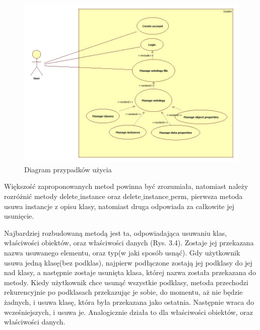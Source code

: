 \documentclass[a4paper,12pt, twoside]{book} %
\begin{document}
  \begin{figure}[h]
 	\centering
 	\includegraphics[scale=0.5]{UseCaseDiagram.jpg}
 	\caption{Diagram przypadków użycia}
 \end{figure}
 
  Większość zaproponowanych metod powinna być zrozumiała, natomiast należy rozróżnić metody delete$\_$instance oraz delete$\_$instance$\_$perm, pierwsza metoda usuwa instancje z opisu klasy, natomiast druga odpowiada za całkowite jej usunięcie.

 


Najbardziej rozbudowaną metodą jest ta, odpowiadająca usuwaniu klas, właściwości obiektów, oraz właściwości danych (Rys. 3.4). Zostaje jej przekazana nazwa usuwanego elementu, oraz typ(w jaki sposób usnąć). Gdy użytkownik usuwa jedną klasę(bez podklas), najpierw podłączone zostają jej podklasy do jej nad klasy, a następnie zostaje usunięta klasa, której nazwa została przekazana do metody. Kiedy użytkownik chce usunąć wszystkie podklasy, metoda przechodzi rekurencyjnie po podklasach przekazując je sobie, do momentu, aż nie będzie żadnych, i usuwa klasę, która była przekazana jako ostatnia. Następnie wraca do wcześniejszych, i usuwa je. Analogicznie działa to dla właściwości obiektów, oraz właściwości danych.
\end{document}

